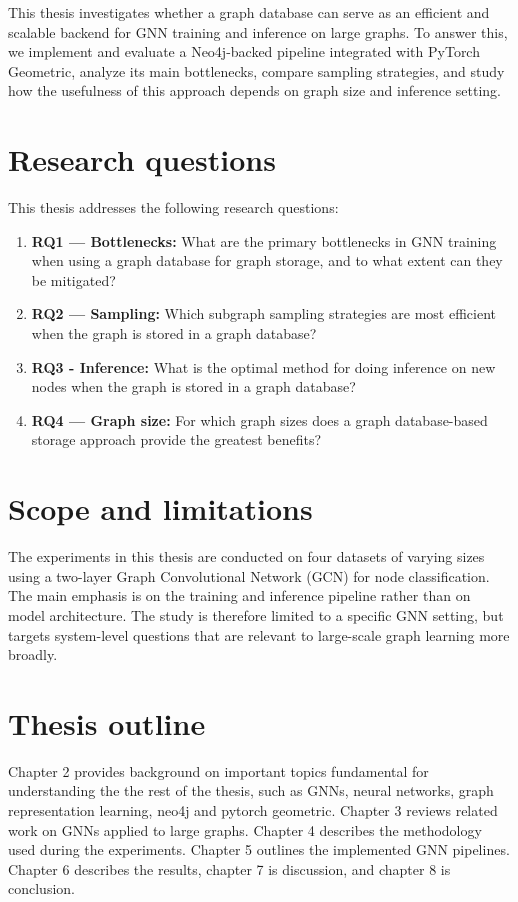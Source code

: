 \documentclass[ oneside,openright,titlepage,numbers=noenddot,headinclude,%
                footinclude=true,cleardoublepage=empty,abstractoff, %
                BCOR=0mm,paper=a4,fontsize=11pt,%
                ngerman,american,%
                ]{scrreprt}
\begin{document}
This thesis investigates whether a graph database can serve as an efficient and scalable backend for GNN training and inference on large graphs. To answer this, we implement and evaluate a Neo4j-backed pipeline integrated with PyTorch Geometric, analyze its main bottlenecks, compare sampling strategies, and study how the usefulness of this approach depends on graph size and inference setting.


\section{Research questions}
This thesis addresses the following research questions:

\begin{enumerate}

    \item \textbf{RQ1 — Bottlenecks:}\label{question:bottleneck} What are the primary bottlenecks in GNN training when using a graph database for graph storage, and to what extent can they be mitigated?

    \item \textbf{RQ2 — Sampling:}\label{question:sampling} Which subgraph sampling strategies are most efficient when the graph is stored in a graph database?

    \item \textbf{RQ3 - Inference:}\label{question:inference} What is the optimal method for doing inference on new nodes when the graph is stored in a graph database?

    \item \textbf{RQ4 — Graph size:}\label{question:graphsize} For which graph sizes does a graph database-based storage approach provide the greatest benefits?

\end{enumerate}
\section{Scope and limitations}
The experiments in this thesis are conducted on four datasets of varying sizes using a two-layer Graph Convolutional Network (GCN) for node classification. The main emphasis is on the training and inference pipeline rather than on model architecture. The study is therefore limited to a specific GNN setting, but targets system-level questions that are relevant to large-scale graph learning more broadly.

\section{Thesis outline}
Chapter 2 provides background on important topics fundamental for understanding the the rest of the thesis, such as GNNs, neural networks, graph representation learning, neo4j and pytorch geometric. Chapter 3 reviews related work on GNNs applied to large graphs. Chapter 4 describes the methodology used during the experiments. Chapter 5 outlines the implemented GNN pipelines. Chapter 6 describes the results, chapter 7 is discussion, and chapter 8 is conclusion.
\end{document}
